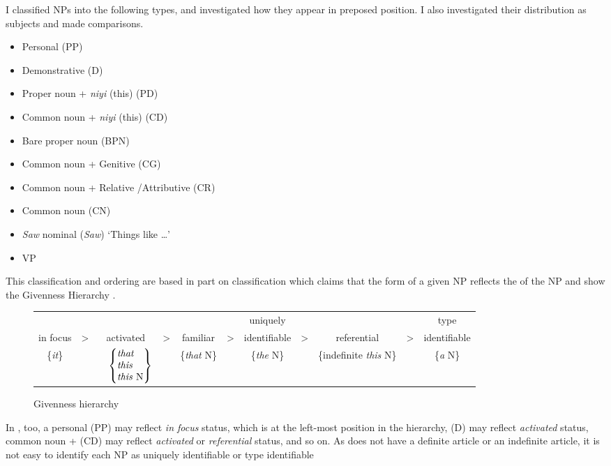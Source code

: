 \documentclass[output=paper
,modfonts
,nonflat]{langsci/langscibook}
\begin{document}
\noindent
I classified NPs into the following types, and investigated how they appear in preposed position. I also investigated their distribution as subjects and made comparisons.

\begin{itemize}
	\item Personal  (PP)
	\item Demonstrative (D)
	\item Proper noun + \textit{niyi} (this) (PD)
	\item Common noun + \textit{niyi} (this) (CD)
	\item Bare proper noun (BPN)
	\item Common noun + Genitive (CG)
	\item Common noun + Relative /Attributive (CR)
	\item Common noun (CN)
	\item \textit{Saw} nominal (\textit{Saw}) ‘Things like …’
	\item VP
\end{itemize}

\noindent
This classification and ordering are based in part on  classification which claims that the form of a given NP reflects the  of the NP and show the Givenness Hierarchy \citep[275]{Gundel1993}.  

\begin{figure}
	\tabcolsep=0.05cm
	\begin{tabular}{ccccccccccc}
		&&&&&& uniquely &&&& type\\
		in focus & > & activated & > & familiar & > &identifiable& > & referential & > &identifiable\\
		\{\textit{it}\} && $\begin{array}{@{}l@{}c@{}}
		\quad&\left\{
		\begin{tabular}{@{}l@{}}
		\textit{that} \\
		\textit{this} \\
		\textit{this} N
		\end{tabular}
		\right\}
		\end{array}$ && \{\textit{that} N\}  && \{\textit{the} N\}  && \{indefinite \textit{this} N\}  && \{\textit{a} N\}\\
	\end{tabular}
	\caption{Givenness hierarchy \citep[275]{Gundel1993}}
	\label{fig:tsukida:1}
\end{figure}

\noindent
In , too, a personal  (PP) may reflect \textit{in focus} status, which is at the left-most position in the hierarchy,  (D) may reflect \textit{activated} status, common noun +  (CD) may reflect \textit{activated} or \textit{referential} status, and so on. As  does not have a definite article or an indefinite article, it is not easy to identify each NP as uniquely identifiable or type identifiable
\end{document}
